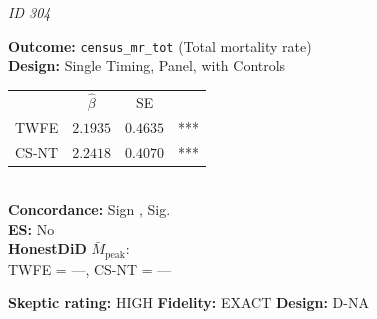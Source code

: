 \begin{tcolorbox}[
  colback=white, colframe=black!60, boxrule=0.4pt,
  arc=2pt, left=4pt, right=4pt, top=3pt, bottom=3pt]
  \footnotesize
  \textbf{\textcite{arthi2022recessions}} \hfill \textit{ID 304}\\[2pt]
  
  \begin{minipage}[t]{0.45\textwidth}
    \textbf{Outcome:} \texttt{census\_mr\_tot} (Total mortality rate)\\
    \textbf{Design:} Single Timing, Panel, with Controls\\
  \end{minipage}\hfill
  \begin{minipage}[t]{0.45\textwidth}
    \begin{tabular}{@{}lccc@{}}
      & $\hat{\beta}$ & SE & \\
      TWFE & $2.1935$ & $0.4635$ & *** \\
      CS-NT & $2.2418$ & $0.4070$ & *** \\
    \end{tabular}\\[3pt]
    \textbf{Concordance:} Sign \checkmark, Sig. \checkmark\\
    \textbf{ES:} No\\
    \textbf{HonestDiD} $\bar{M}_{\text{peak}}$:\\
    TWFE = ---, CS-NT = ---
  \end{minipage}
  \tcbline
  \textbf{Skeptic rating:} HIGH \hfill \textbf{Fidelity:} EXACT \hfill \textbf{Design:} D-NA
\end{tcolorbox}
\vspace{6pt}

